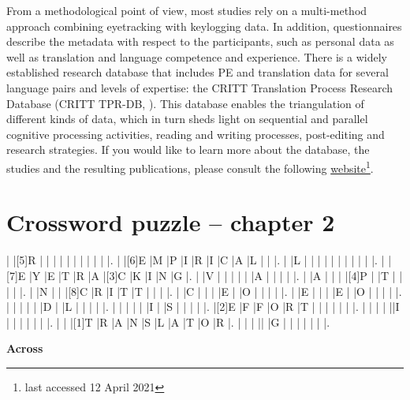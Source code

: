 From a methodological point of view, most studies rely on a multi-method approach combining eyetracking with keylogging data. In addition, questionnaires describe the metadata with respect to the participants, such as personal data as well as translation and language competence and experience. There is a widely established research database that includes PE and translation data for several language pairs and levels of expertise: the CRITT Translation Process Research Database (CRITT TPR-DB, \citealt{carl2016critt}). This database enables the triangulation of different kinds of data, which in turn sheds light on sequential and parallel cognitive processing activities, reading and writing processes, post-editing and research strategies. If you would like to learn more about the database, the studies and the resulting publications, please consult the following \href{https://sites.google.com/site/centretranslationinnovation/tpr-db}{website}\footnote{last accessed 12 April 2021}.

\newpage

\section*{Crossword puzzle -- chapter 2}

\begin{Puzzle}{12}{15}
|{} |[5]R 	|{} |{}  |{}     |{}  |{}     |{}  |{}    |{}  |{}    |{}   |.
|{} |[6]E   |M  |P |I    |R |I    |C |A   |L |{}    |{} |.
|{} |L   	|{} |{} |{}  |{} |{}    |{} |{}   |{} |{}    |{}   |.
|{} |[7]E   |Y 	|E  |T  |R  |A  |[3]C  |K    |I  |N     |G    |.
|{} |V   	|{} |{} |{} |{} |{} |A |{}   |{} |{}    |{}   |.
|{} |A   	|{} |{} |{} |[4]P |{} |T |{} |{}  |{}     |{}    |.
|{} |N    	|{} |{} |[8]C |R |I    |T |T   |{} |{}    |{}   |.
|{} |C   	|{} |{} |{} |E  |{}  |O  |{}    |{}  |{} |{}    |.
|{} |E   	|{} |{} |{} |E |{}   |O |{}   |{} |{}     |{}   |.
|{} |{}   	|{} |{} |{} |D |{} 	 |L  |{}    |{}  |{}     |{}    |.
|{} |{}   	|{} |{} |{} |I |{}   |S |{}   |{} |{}     |{}   |.
|[2]E  |F   |F  |O |R  |T |{}    |{} |{}   |{} |{}    |{}   |.
|{} |{}   |{}   |{} |{}|I |{}    |{} |{}   |{} |{}    |{}   |.
|{} |{}   |[1]T |R |A    |N |S    |L |A   |T |O    |R   |.
|{} |{}   |{}   |{}|{}   |G |{}    |{} |{}   |{} |{}    |{}   |.
\end{Puzzle}

\begin{PuzzleClues}{\textbf{Across}}
\end{PuzzleClues}

